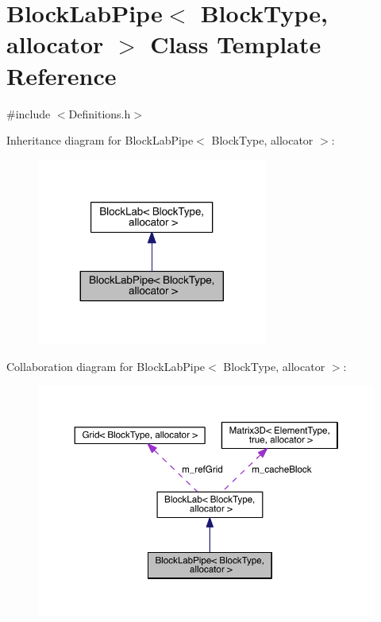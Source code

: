 \hypertarget{class_block_lab_pipe}{}\section{Block\+Lab\+Pipe$<$ Block\+Type, allocator $>$ Class Template Reference}
\label{class_block_lab_pipe}


{\ttfamily \#include $<$Definitions.\+h$>$}



Inheritance diagram for Block\+Lab\+Pipe$<$ Block\+Type, allocator $>$\+:\nopagebreak
\begin{figure}[H]
\begin{center}
\leavevmode
\includegraphics[width=215pt]{d1/dfa/class_block_lab_pipe__inherit__graph}
\end{center}
\end{figure}


Collaboration diagram for Block\+Lab\+Pipe$<$ Block\+Type, allocator $>$\+:\nopagebreak
\begin{figure}[H]
\begin{center}
\leavevmode
\includegraphics[width=350pt]{da/d2a/class_block_lab_pipe__coll__graph}
\end{center}
\end{figure}
